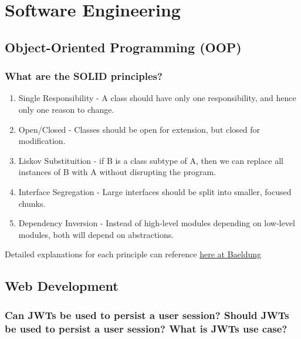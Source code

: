 \documentclass[12pt, a4paper]{article}
\begin{document}
\noindent

\tableofcontents

\pagebreak

\section*{Software Engineering}

\subsection*{Object-Oriented Programming (OOP)}

\subsubsection*{What are the SOLID principles?}
\begin{enumerate}
  \item Single Responsibility - A class should have only one responsibility, and hence only one reason to change.
  \item Open/Closed - Classes should be open for extension, but closed for modification.
  \item Liskov Substituition - if B is a class subtype of A, then we can replace all instances of B with A without disrupting the program.
  \item Interface Segregation - Large interfaces should be split into smaller, focused chunks.
  \item Dependency Inversion - Instead of high-level modules depending on low-level modules, both will depend on abstractions.
\end{enumerate}

Detailed explanations for each principle can reference \href{https://www.baeldung.com/solid-principles}{here at Baeldung}

\subsection*{Web Development}

\subsubsection*{Can JWTs be used to persist a user session? Should JWTs be used to persist a user session? What is JWTs use case?}
\end{document}
